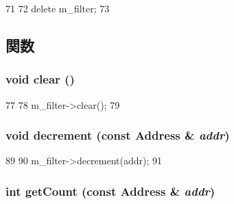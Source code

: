 \begin{DoxyCode}
71 {
72     delete m_filter;
73 }
\end{DoxyCode}


\subsection{関数}
\hypertarget{classGenericBloomFilter_ac8bb3912a3ce86b15842e79d0b421204}{
\subsubsection[{clear}]{\setlength{\rightskip}{0pt plus 5cm}void clear ()}}
\label{classGenericBloomFilter_ac8bb3912a3ce86b15842e79d0b421204}



\begin{DoxyCode}
77 {
78     m_filter->clear();
79 }
\end{DoxyCode}
\hypertarget{classGenericBloomFilter_addb6b805abb8328082a24926f2bf8c84}{
\subsubsection[{decrement}]{\setlength{\rightskip}{0pt plus 5cm}void decrement (const {\bf Address} \& {\em addr})}}
\label{classGenericBloomFilter_addb6b805abb8328082a24926f2bf8c84}



\begin{DoxyCode}
89 {
90     m_filter->decrement(addr);
91 }
\end{DoxyCode}
\hypertarget{classGenericBloomFilter_abb722634d5846105b673e9496df8d062}{
\subsubsection[{getCount}]{\setlength{\rightskip}{0pt plus 5cm}int getCount (const {\bf Address} \& {\em addr})}}
\label{classGenericBloomFilter_abb722634d5846105b673e9496df8d062}




